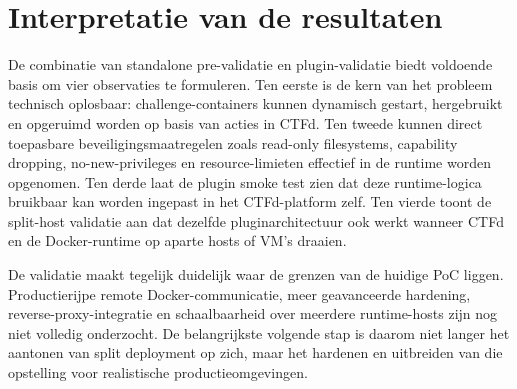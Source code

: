 \section{Interpretatie van de resultaten}%
\label{sec:validatie-conclusie}

De combinatie van standalone pre-validatie en plugin-validatie biedt voldoende basis om vier observaties te formuleren. Ten eerste is de kern van het probleem technisch oplosbaar: challenge-containers kunnen dynamisch gestart, hergebruikt en opgeruimd worden op basis van acties in CTFd. Ten tweede kunnen direct toepasbare beveiligingsmaatregelen zoals read-only filesystems, capability dropping, no-new-privileges en resource-limieten effectief in de runtime worden opgenomen. Ten derde laat de plugin smoke test zien dat deze runtime-logica bruikbaar kan worden ingepast in het CTFd-platform zelf. Ten vierde toont de split-host validatie aan dat dezelfde pluginarchitectuur ook werkt wanneer CTFd en de Docker-runtime op aparte hosts of VM's draaien.

De validatie maakt tegelijk duidelijk waar de grenzen van de huidige PoC liggen. Productierijpe remote Docker-communicatie, meer geavanceerde hardening, reverse-proxy-integratie en schaalbaarheid over meerdere runtime-hosts zijn nog niet volledig onderzocht. De belangrijkste volgende stap is daarom niet langer het aantonen van split deployment op zich, maar het hardenen en uitbreiden van die opstelling voor realistische productieomgevingen.
